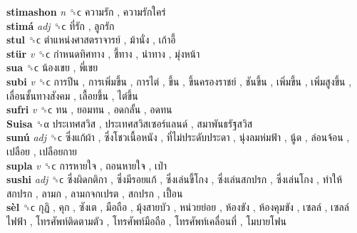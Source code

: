 \textbf{stimashon} \emph{n}  ␝ϲ   ความรัก ,  ความรักใคร่   \\
\textbf{stimá} \emph{adj}  ␝ϲ   ที่รัก ,  ลูกรัก   \\
\textbf{stul} ␝ϲ   ตำแหน่งศาสตราจารย์ ,  ม้านั่ง ,  เก้าอี้   \\
\textbf{stür} \emph{v}  ␝ϲ   กำหนดทิศทาง ,  ชี้ทาง ,  นำทาง ,  มุ่งหน้า   \\
\textbf{sua} ␝ϲ   น้องเขย ,  พี่เขย   \\
\textbf{subi} \emph{v}  ␝ϲ   การปีน ,  การเพิ่มขึ้น ,  การไต่ ,  ขึ้น ,  ขึ้นครองราชย์ ,  ชันขึ้น ,  เพิ่มขี้น ,  เพิ่มสูงขึ้น ,  เลื่อนชั้นทางสังคม ,  เลื้อยขึ้น ,  ไต่ขึ้น   \\
\textbf{sufri} \emph{v}  ␝ϲ   ทน ,  ยอมทน ,  อดกลั้น ,  อดทน   \\
\textbf{Suisa} ␝α   ประเทศสวิส ,  ประเทศสวิสเซอร์แลนด์ ,  สมาพันธรัฐสวิส   \\
\textbf{sunú} \emph{adj}  ␝ϲ   ซึ่งแก้ผ้า ,  ซึ่งโชวเนื้อหนัง ,  ที่ไม่ประดับประดา ,  นุ่งลมห่มฟ้า ,  นู้ด ,  ล่อนจ้อน ,  เปลือย ,  เปลือยกาย   \\
\textbf{supla} \emph{v}  ␝ϲ   การหายใจ ,  ถอนหายใจ ,  เป่า   \\
\textbf{sushi} \emph{adj}  ␝ϲ   ซึ่งผิดกติกา ,  ซึ่งมีรอยแก้ ,  ซึ่งเล่นขี้โกง ,  ซึ่งเล่นสกปรก ,  ซึ่งเล่นโกง ,  ทำให้สกปรก ,  ลามก ,  ลามกจกเปรต ,  สกปรก ,  เปื้อน   \\
\textbf{sèl} ␝ϲ   กุฏิ ,  คุก ,  ซังเต ,  มือถือ ,  มุ้งสายบัว ,  หน่วยย่อย ,  ห้องขัง ,  ห้องคุมขัง ,  เซลล์ ,  เซลล์ไฟฟ้า ,  โทรศัพท์ติดตามตัว ,  โทรศัพท์มือถือ ,  โทรศัพท์เคลื่อนที่ ,  โมบายโฟน   \\
